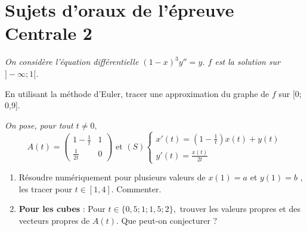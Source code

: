 \section{Sujets d'oraux de l'épreuve Centrale 2}
\begin{Exercise}\it
 On considère l’équation différentielle  $(1 - x)^3y''= y$.
 $f$ est la solution sur $]-\infty; 1[$.
 
En utilisant la méthode d’Euler, tracer une approximation du graphe de $f$ sur [0; 0,9].
\end{Exercise}
\begin{Answer}

\end{Answer}
\begin{Exercise}\it 
On pose, pour tout $t\ne 0,$ 
$$A(t)=\begin{pmatrix}1-\frac1t & 1 \\ \frac{1}{2t} & 0 \end{pmatrix} \text{ et } (S)\left\{\begin{array}{l} x'(t)=\left(1-\frac1t \right)x(t)+y(t)\\ y'(t)=\frac{x(t)}{2t}\end{array}\right.$$
\begin{enumerate}
\item Résoudre numériquement pour plusieurs valeurs de $x(1) = a$ et $y(1)=b$ , les tracer pour $t\in[1,4]. $ Commenter.
\item {\bf Pour les cubes} : Pour $t\in\{0,5 ; 1 ; 1,5 ; 2\}, $ trouver les valeurs propres et des vecteurs propres de $A(t)$. Que peut-on conjecturer ?
\end{enumerate}
\end{Exercise}
\begin{Answer}

\end{Answer}
